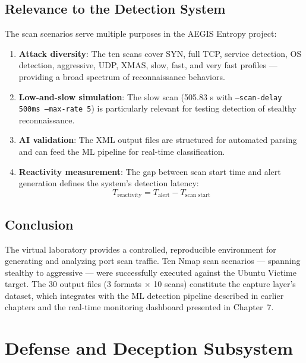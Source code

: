 \documentclass[12pt,a4paper]{report}
\begin{document}
\section{Relevance to the Detection System}

The scan scenarios serve multiple purposes in the AEGIS Entropy project:

\begin{enumerate}
    \item \textbf{Attack diversity}: The ten scans cover SYN, full TCP, service detection, OS detection, aggressive, UDP, XMAS, slow, fast, and very fast profiles --- providing a broad spectrum of reconnaissance behaviors.
    \item \textbf{Low-and-slow simulation}: The slow scan (505.83 s with \texttt{--scan-delay 500ms --max-rate 5}) is particularly relevant for testing detection of stealthy reconnaissance.
    \item \textbf{AI validation}: The XML output files are structured for automated parsing and can feed the ML pipeline for real-time classification.
    \item \textbf{Reactivity measurement}: The gap between scan start time and alert generation defines the system's detection latency:
    \[
    T_{\text{reactivity}} = T_{\text{alert}} - T_{\text{scan start}}
    \]
\end{enumerate}

\section{Conclusion}

The virtual laboratory provides a controlled, reproducible environment for generating and analyzing port scan traffic. Ten Nmap scan scenarios --- spanning stealthy to aggressive --- were successfully executed against the Ubuntu Victime target. The 30 output files (3 formats $\times$ 10 scans) constitute the capture layer's dataset, which integrates with the ML detection pipeline described in earlier chapters and the real-time monitoring dashboard presented in Chapter~7.

\chapter{Defense and Deception Subsystem}\label{ch:defense}
\end{document}
